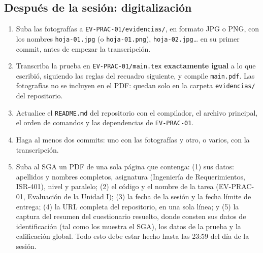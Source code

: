 \documentclass[11pt]{article}
\newcommand{\subseccion}[1]{\subsection{\textcolor{midblue}{#1}}}
\begin{document}
\subseccion{Después de la sesión: digitalización}

\begin{enumerate}[leftmargin=18pt,itemsep=2pt]
	\item Suba las fotografías a \texttt{EV-PRAC-01/evidencias/}, en formato JPG o PNG, con los nombres \texttt{hoja-01.jpg} (o \texttt{hoja-01.png}), \texttt{hoja-02.jpg}\ldots{} en su primer commit, antes de empezar la transcripción.
	\item Transcriba la prueba en \texttt{EV-PRAC-01/main.tex} \textbf{exactamente igual} a lo que escribió, siguiendo las reglas del recuadro siguiente, y compile \texttt{main.pdf}. Las fotografías no se incluyen en el PDF: quedan solo en la carpeta \texttt{evidencias/} del repositorio.
	\item Actualice el \texttt{README.md} del repositorio con el compilador, el archivo principal, el orden de comandos y las dependencias de \texttt{EV-PRAC-01}.
	\item Haga al menos dos commits: uno con las fotografías y otro, o varios, con la transcripción.
	\item Suba al SGA un PDF de una sola página que contenga: (1) sus datos: apellidos y nombres completos, asignatura (Ingeniería de Requerimientos, ISR-401), nivel y paralelo; (2) el código y el nombre de la tarea (EV-PRAC-01, Evaluación de la Unidad I); (3) la fecha de la sesión y la fecha límite de entrega; (4) la URL completa del repositorio, en una sola línea; y (5) la captura del resumen del cuestionario resuelto, donde consten sus datos de identificación (tal como los muestra el SGA), los datos de la prueba y la calificación global. Todo esto debe estar hecho hasta las 23:59 del día de la sesión.
\end{enumerate}
\end{document}
